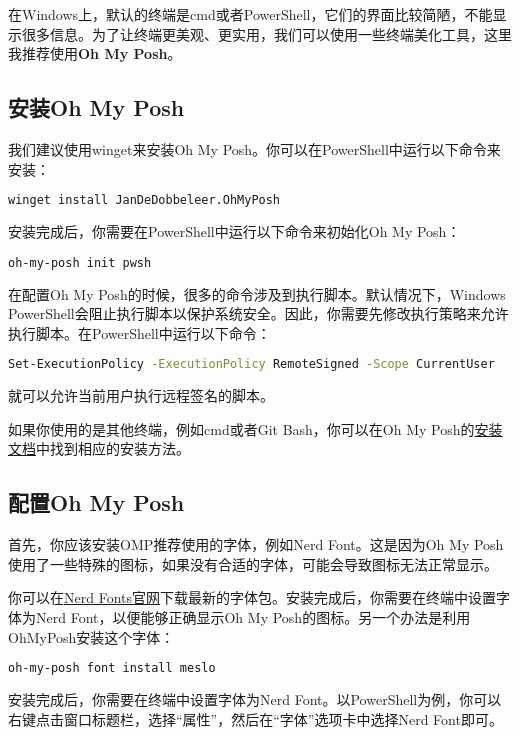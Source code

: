 \documentclass[../main.tex]{subfiles}
\begin{document}
在Windows上，默认的终端是cmd或者PowerShell，它们的界面比较简陋，不能显示很多信息。为了让终端更美观、更实用，我们可以使用一些终端美化工具，这里我推荐使用\textbf{Oh My Posh}。

\subsection{安装Oh My Posh}

我们建议使用winget来安装Oh My Posh。你可以在PowerShell中运行以下命令来安装：

\begin{lstlisting}[language=bash]
  winget install JanDeDobbeleer.OhMyPosh
\end{lstlisting}

安装完成后，你需要在PowerShell中运行以下命令来初始化Oh My Posh：
\begin{lstlisting}[language=bash]
  oh-my-posh init pwsh
\end{lstlisting}

在配置Oh My Posh的时候，很多的命令涉及到执行脚本。默认情况下，Windows PowerShell会阻止执行脚本以保护系统安全。因此，你需要先修改执行策略来允许执行脚本。在PowerShell中运行以下命令：
\begin{lstlisting}[language=bash]
  Set-ExecutionPolicy -ExecutionPolicy RemoteSigned -Scope CurrentUser
\end{lstlisting}
就可以允许当前用户执行远程签名的脚本。

如果你使用的是其他终端，例如cmd或者Git Bash，你可以在Oh My Posh的\href{https://ohmyposh.dev/docs/installation}{安装文档}中找到相应的安装方法。

\subsection{配置Oh My Posh}

首先，你应该安装OMP推荐使用的字体，例如Nerd Font。这是因为Oh My Posh使用了一些特殊的图标，如果没有合适的字体，可能会导致图标无法正常显示。

你可以在\href{https://www.nerdfonts.com/}{Nerd Fonts官网}下载最新的字体包。安装完成后，你需要在终端中设置字体为Nerd Font，以便能够正确显示Oh My Posh的图标。另一个办法是利用OhMyPosh安装这个字体：
\begin{lstlisting}[language=bash]
  oh-my-posh font install meslo
\end{lstlisting}

安装完成后，你需要在终端中设置字体为Nerd Font。以PowerShell为例，你可以右键点击窗口标题栏，选择“属性”，然后在“字体”选项卡中选择Nerd Font即可。
\end{document}
